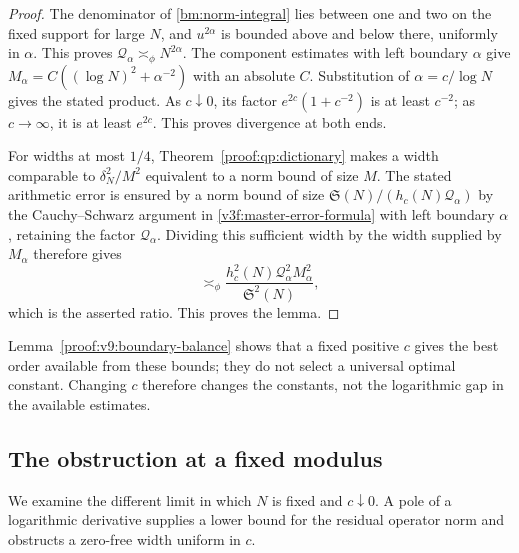 \documentclass[12pt,a4paper]{amsart}
\numberwithin{equation}{section}
\theoremstyle{plain}
\theoremstyle{definition}
\theoremstyle{remark}
\begin{document}
\begin{proof}
The denominator of \eqref{bm:norm-integral} lies between one and
two on the fixed support for large $N$, and $u^{2\alpha}$ is
bounded above and below there, uniformly in $\alpha$.
This proves $\mathcal Q_\alpha\asymp_\phi N^{2\alpha}$.
The component estimates with left boundary $\alpha$ give
$M_\alpha=C((\log N)^2+\alpha^{-2})$ with an absolute $C$.
Substitution of $\alpha=c/\log N$ gives the stated product.
As $c\downarrow0$, its factor $e^{2c}(1+c^{-2})$ is at least
$c^{-2}$; as $c\to\infty$, it is at least $e^{2c}$.
This proves divergence at both ends.

For widths at most $1/4$, Theorem~\ref{proof:qp:dictionary}
makes a width comparable to $\delta_N^2/M^2$ equivalent to
a norm bound of size $M$. The stated arithmetic error is ensured
by a norm bound of size $\mathfrak S(N)/(h_c(N)\mathcal Q_\alpha)$
by the Cauchy--Schwarz argument in
\eqref{v3f:master-error-formula} with left boundary $\alpha$,
retaining the factor $\mathcal Q_\alpha$.
Dividing this sufficient width by the width supplied by $M_\alpha$
therefore gives
\[
 \asymp_\phi
 \frac{h_c^2(N)\mathcal Q_\alpha^2M_\alpha^2}
      {\mathfrak S^2(N)},
\]
which is the asserted ratio.
This proves the lemma.
\end{proof}

Lemma~\ref{proof:v9:boundary-balance} shows that a fixed positive
$c$ gives the best order
available from these bounds; they do not select a universal
optimal constant.
Changing $c$ therefore changes the constants, not the logarithmic
gap in the available estimates.

\subsection{The obstruction at a fixed modulus}
\label{proof:app:param:fixed-modulus}\label{proof:sec:small-c-obstruction}

We examine the different limit in which $N$ is fixed and
$c\downarrow0$. A pole of a logarithmic derivative supplies
a lower bound for the residual operator norm and obstructs
a zero-free width uniform in $c$.
\end{document}
